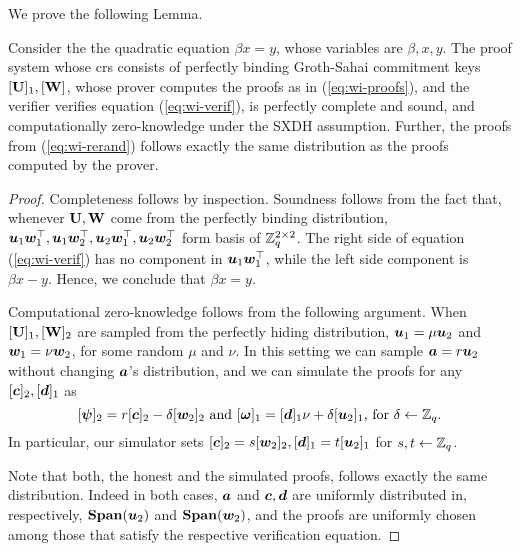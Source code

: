 We prove the following Lemma.
\begin{lemma} \label{lemma:betax=y}
Consider the the quadratic equation $\beta x = y$, whose variables are $\beta,x,y$. 
The proof system whose crs consists of perfectly binding Groth-Sahai commitment keys $[\mathbf{{U}}]_1,[\mathbf{{W}}]$, whose prover computes the proofs as in (\ref{eq:wi-proofs}), and the verifier verifies equation (\ref{eq:wi-verif}), is perfectly complete and sound, and computationally zero-knowledge under the SXDH assumption. Further, the proofs from (\ref{eq:wi-rerand}) follows exactly the same distribution as the proofs computed by the prover.
\end{lemma}
\begin{proof}
Completeness follows by inspection. 
Soundness follows from the fact that, whenever $\mathbf{{U}},\mathbf{{W}}$ come from the perfectly binding distribution, ${\boldsymbol{u}}_1{\boldsymbol{w}}_1^\top,{\boldsymbol{u}}_1{\boldsymbol{w}}_2^\top,\allowbreak{\boldsymbol{u}}_2{\boldsymbol{w}}_1^\top,\allowbreak{\boldsymbol{u}}_2{\boldsymbol{w}}_2^\top$ form basis of $\mathbb{Z}_q^{2\times 2}$.
The right side of equation (\ref{eq:wi-verif}) has no component in ${\boldsymbol{u}}_1{\boldsymbol{w}}^\top_1$, while the left side component is $\beta x-y$. Hence, we conclude that $\beta x = y$.

Computational zero-knowledge follows from the following argument.
When $[\mathbf{{U}}]_1,[\mathbf{{W}}]_2$ are sampled from the perfectly hiding distribution, ${\boldsymbol{u}}_1 = \mu{\boldsymbol{u}}_2$ and ${\boldsymbol{w}}_1  = \nu{\boldsymbol{w}}_2$, for some random $\mu$ and $\nu$. In this setting we can sample ${\boldsymbol{a}} = r{\boldsymbol{u}}_2$ without changing ${\boldsymbol{a}}$'s distribution, and we can simulate the proofs for any $[{\boldsymbol{c}}]_2,[{\boldsymbol{d}}]_1$ as 
\begin{equation} \label{eq:sim-proofs}
[{\boldsymbol{\psi}}]_2 = r[{\boldsymbol{c}}]_2-\delta[{\boldsymbol{w}}_2]_2\text{ and }[{\boldsymbol{\omega}}]_1 = [{\boldsymbol{d}}]_1\nu + \delta[{\boldsymbol{u}}_2]_1\text{, for } \delta\gets\mathbb{Z}_q.
\end{equation} 
In particular, our simulator sets $[{\boldsymbol{c}}]_2=s[{\boldsymbol{w}}_2]_2,[{\boldsymbol{d}}]_1=t[{\boldsymbol{u}}_2]_1$ for $s,t\gets\mathbb{Z}_q$.

Note that both, the honest and the simulated proofs, follows exactly the same distribution. Indeed in both cases, ${\boldsymbol{a}}$ and ${\boldsymbol{c}},{\boldsymbol{d}}$ are uniformly distributed in, respectively, $\mathbf{Span}({\boldsymbol{u}}_2)$ and $\mathbf{Span}({\boldsymbol{w}}_2)$, and the proofs are uniformly chosen among those that satisfy the respective verification equation.


\end{proof}
